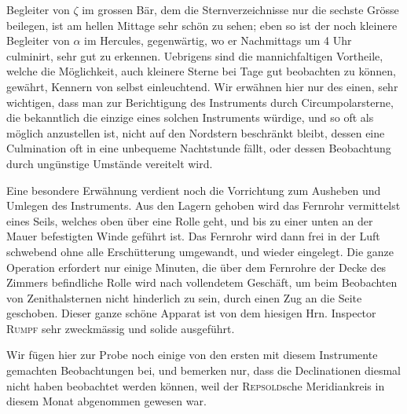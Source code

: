 Begleiter von $\zeta$ im grossen Bär, dem die Sternverzeichnisse nur die sechste Grösse beilegen, ist
am hellen Mittage sehr schön zu sehen; eben so ist der noch kleinere Begleiter von $\alpha$ im
Hercules, gegenwärtig, wo er Nachmittags um 4 Uhr culminirt, sehr gut zu erkennen. Uebrigens sind die
mannichfaltigen Vortheile, welche die Möglichkeit, auch kleinere Sterne bei Tage gut beobachten zu
können, gewährt, Kennern von selbst einleuchtend. Wir erwähnen hier nur des einen, sehr wichtigen,
dass man zur Berichtigung des Instruments durch Circumpolarsterne, die bekanntlich die einzige eines
solchen Instruments würdige, und so oft als möglich anzustellen ist, nicht auf den Nordstern
beschränkt bleibt, dessen eine Culmination oft in eine unbequeme Nachtstunde fällt, oder dessen
Beobachtung durch ungünstige Umstände vereitelt wird.

\par\indent Eine besondere Erwähnung verdient noch die Vorrichtung zum Ausheben und Umlegen des Instruments.
Aus den Lagern gehoben wird das Fernrohr vermittelst eines Seils, welches oben über eine Rolle geht,
und bis zu einer unten an der Mauer befestigten Winde geführt ist. Das Fernrohr wird dann frei in der
Luft schwebend ohne alle Erschütterung umgewandt, und wieder eingelegt. Die ganze Operation erfordert
nur einige Minuten, die über dem Fernrohre der Decke des Zimmers befindliche Rolle wird nach
vollendetem Geschäft, um beim Beobachten von Zenithalsternen nicht hinderlich zu sein, durch einen
Zug an die Seite geschoben. 
Dieser ganze schöne Apparat ist von dem hiesigen Hrn. Inspector \textsc{Rumpf} sehr zweckmässig und
solide ausgeführt.

\par\indent Wir fügen hier zur Probe noch einige von den ersten mit diesem Instrumente gemachten Beobachtungen
bei, und bemerken nur, dass die Declinationen diesmal nicht haben beobachtet werden können, weil der
\textsc{Repsold}sche Meridiankreis in diesem Monat abgenommen gewesen war.

